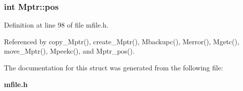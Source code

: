 \subsubsection{\setlength{\rightskip}{0pt plus 5cm}int \bf{Mptr::pos}}\label{structMptr_6d707679983fe8f7efe752da57ec0366}




Definition at line 98 of file mfile.h.

Referenced by copy\_\-Mptr(), create\_\-Mptr(), Mbackupc(), Merror(), Mgetc(), move\_\-Mptr(), Mpeekc(), and Mptr\_\-pos().

The documentation for this struct was generated from the following file:\begin{CompactItemize}
\item 
\bf{mfile.h}\end{CompactItemize}
